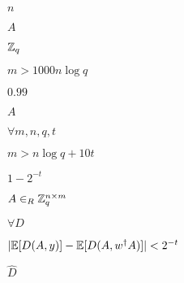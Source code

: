 \documentclass[10pt]{book}
\begin{document}
\begin{mdSnippets}
\begin{mdInlineSnippet}[7b8b965ad4bca0e41ab51de7b31363a1]
$n$\end{mdInlineSnippet}%
\begin{mdInlineSnippet}[7fc56270e7a70fa81a5935b72eacbe29]%
$A$\end{mdInlineSnippet}%
\begin{mdInlineSnippet}[b6c02ab1f81305fa30578e3ad5244171]%
$\mathbb{Z}_q$\end{mdInlineSnippet}%
\begin{mdInlineSnippet}[5c6c020e6e73623b0f2a01ba46dc0b3e]%
$m> 1000 n \log q$\end{mdInlineSnippet}%
\begin{mdInlineSnippet}%
$0.99$\end{mdInlineSnippet}%
\begin{mdInlineSnippet}[7fc56270e7a70fa81a5935b72eacbe29]%
$A$\end{mdInlineSnippet}%
\begin{mdInlineSnippet}[2d13f2d6bab7e79b5b527f7085e6e5b3]%
$\forall m,n,q,t$\end{mdInlineSnippet}%
\begin{mdInlineSnippet}%
$m > n \log q + 10t$\end{mdInlineSnippet}%
\begin{mdInlineSnippet}%
$1 - 2^{-t}$\end{mdInlineSnippet}%
\begin{mdInlineSnippet}%
$A \in_R \mathbb{Z}_q^{n \times m}$\end{mdInlineSnippet}%
\begin{mdInlineSnippet}[c792e7f7ca25221f7ce4b0d774f12187]%
$\forall D$\end{mdInlineSnippet}%
\begin{mdInlineSnippet}%
$|\mathbb{E}[D(A,y)] - \mathbb{E}[D(A,w^\dag A)]| < 2^{-t}$\end{mdInlineSnippet}%
\begin{mdInlineSnippet}[4587a9c1f8d3a5ddf27bc343c807f4fc]%
$\hat{D}$\end{mdInlineSnippet}%
\begin{mdInlineSnippet}[d336fe65a1b9e2baa5f2424b11c4cb7a]%

\end{mdInlineSnippet}
\end{mdSnippets}
\end{document}
